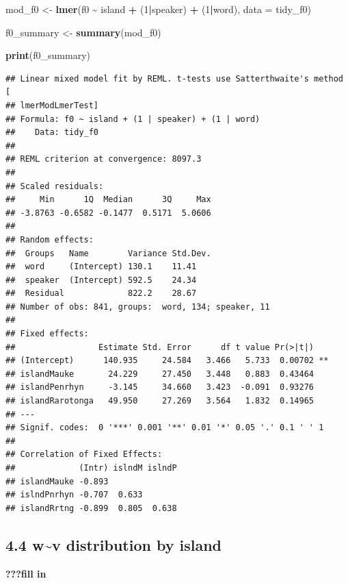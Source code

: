 \documentclass[
  ,man,floatsintext]{apa6}
\newenvironment{Shaded}{\begin{snugshade}}{\end{snugshade}}
\newcommand{\AttributeTok}[1]{\textcolor[rgb]{0.13,0.29,0.53}{#1}}
\newcommand{\DecValTok}[1]{\textcolor[rgb]{0.00,0.00,0.81}{#1}}
\newcommand{\FunctionTok}[1]{\textcolor[rgb]{0.13,0.29,0.53}{\textbf{#1}}}
\newcommand{\NormalTok}[1]{#1}
\newcommand{\OtherTok}[1]{\textcolor[rgb]{0.56,0.35,0.01}{#1}}
\newcommand{\SpecialCharTok}[1]{\textcolor[rgb]{0.81,0.36,0.00}{\textbf{#1}}}
\begin{document}
\begin{Shaded}
\begin{Highlighting}[]
\NormalTok{mod\_f0 }\OtherTok{\textless{}{-}} \FunctionTok{lmer}\NormalTok{(f0 }\SpecialCharTok{\textasciitilde{}}\NormalTok{ island }\SpecialCharTok{+}\NormalTok{ (}\DecValTok{1}\SpecialCharTok{|}\NormalTok{speaker) }\SpecialCharTok{+}\NormalTok{ (}\DecValTok{1}\SpecialCharTok{|}\NormalTok{word), }\AttributeTok{data =}\NormalTok{ tidy\_f0)}

\NormalTok{f0\_summary }\OtherTok{\textless{}{-}} \FunctionTok{summary}\NormalTok{(mod\_f0) }

\FunctionTok{print}\NormalTok{(f0\_summary)}
\end{Highlighting}
\end{Shaded}

\begin{verbatim}
## Linear mixed model fit by REML. t-tests use Satterthwaite's method [
## lmerModLmerTest]
## Formula: f0 ~ island + (1 | speaker) + (1 | word)
##    Data: tidy_f0
## 
## REML criterion at convergence: 8097.3
## 
## Scaled residuals: 
##     Min      1Q  Median      3Q     Max 
## -3.8763 -0.6582 -0.1477  0.5171  5.0606 
## 
## Random effects:
##  Groups   Name        Variance Std.Dev.
##  word     (Intercept) 130.1    11.41   
##  speaker  (Intercept) 592.5    24.34   
##  Residual             822.2    28.67   
## Number of obs: 841, groups:  word, 134; speaker, 11
## 
## Fixed effects:
##                 Estimate Std. Error      df t value Pr(>|t|)   
## (Intercept)      140.935     24.584   3.466   5.733  0.00702 **
## islandMauke       24.229     27.450   3.448   0.883  0.43464   
## islandPenrhyn     -3.145     34.660   3.423  -0.091  0.93276   
## islandRarotonga   49.950     27.269   3.564   1.832  0.14965   
## ---
## Signif. codes:  0 '***' 0.001 '**' 0.01 '*' 0.05 '.' 0.1 ' ' 1
## 
## Correlation of Fixed Effects:
##             (Intr) islndM islndP
## islandMauke -0.893              
## islndPnrhyn -0.707  0.633       
## islandRrtng -0.899  0.805  0.638
\end{verbatim}

\subsection{4.4 w\textasciitilde v distribution by island}\label{wv-distribution-by-island}

\textbf{???fill in}
\end{document}

